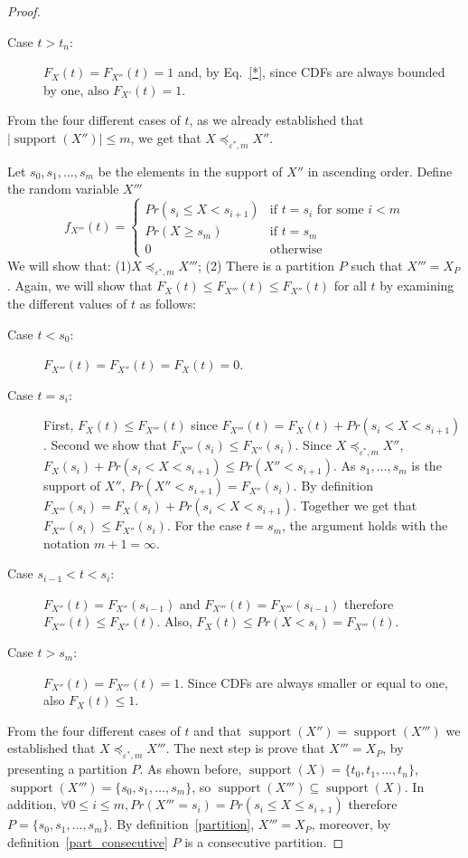 \documentclass[review]{elsarticle}
\DeclareMathOperator{\supp}{support}
\DeclareMathOperator{\support}{support}
\begin{document}
\begin{proof}
\begin{description}
\item[Case $t > t_n$:] $F_{X}(t)= F_{X''}(t)=1$ and, by Eq.~\eqref{*}, since CDFs are always bounded by one, also $F_{X'}(t)=1$.

\end{description}
From the four different cases of $t$, as we already established that $|\supp(X'')|\leq m$, we get that $X \preceq_{\varepsilon^*,m} X''$. 

Let $s_0,s_1,\dots,s_m$ be the elements in the support of $X''$ in ascending order. Define the random variable $X'''$
$$
f_{X'''}(t) = \begin{cases}
Pr(s_{i} \leq X < s_{i+1}) & \text{if } t=s_i \text{ for some } i < m \\ 
Pr(X \geq s_m)           & \text{if } t=s_m  \\ 
0                        & \text{otherwise}
\end{cases}
$$
We will show that: (1)$X \preceq_{\varepsilon^*,m} X'''$; (2) There is a partition $P$ such that $X'''=X_P$. 
Again, we will show that $F_{X}(t) \leq  F_{X'''}(t) \leq F_{X''}(t)$ for all $t$ by examining the different values of $t$ as follows: 
\begin{description}
\item[Case $t < s_0$:] $F_{X'''}(t)=F_{X''}(t)=F_{X}(t)=0$. 
\item[Case $t=s_i$:] First, $F_{X}(t) \leq F_{X'''}(t)$ since $F_{X'''}(t) = F_{X}(t)+Pr(s_{i} < X < s_{i+1})$.
Second we show that  $F_{X'''}(s_i) \leq F_{X''}(s_i)$. Since $X \preceq_{\varepsilon^*,m} X''$, $F_X(s_i) + Pr(s_i < X < s_{i+1}) \leq  Pr(X''<s_{i+1})$. As $s_1,\dots,s_m$ is the support of $X''$, $Pr(X''<s_{i+1}) = F_{X''}(s_i)$. By definition $F_{X'''}(s_i) = F_X(s_i) + Pr(s_i < X < s_{i+1})$. Together we get that $F_{X'''}(s_i) \leq F_{X''}(s_i)$. For the case $t=s_m$, the argument holds with the notation $m+1=\infty$. 

\item[Case $s_{i-1} < t < s_i$:] $F_{X''}(t)= F_{X''}(s_{i-1})$ and $F_{X'''}(t)= F_{X'''}(s_{i-1})$ therefore $F_{X'''}(t) \leq F_{X''}(t)$. Also, $F_X(t) \leq Pr(X<s_i) = F_{X'''}(t)$.
\item[Case $t > s_m$:] $F_{X''}(t)= F_{X'''}(t)=1$. Since CDFs are always smaller or equal to one, also $F_{X}(t)\leq1$. 
\end{description}
From the four different cases of $t$ and that $\supp(X'')=\supp(X''')$ we established that $X \preceq_{\varepsilon^*,m} X'''$. 
The next step is prove that $X'''=X_P$, by presenting a partition $P$. As shown before, $\support(X)=\{t_0,t_1,\dots,t_n\}$,  $\support(X''')=\{s_0,s_1,\dots,s_m\}$, so $\support(X''')\subseteq \support(X)$. In addition, $\forall 0\leq i\leq m, Pr(X'''=s_i) = Pr(s_i \leq X \leq s_{i+1})$ therefore $P = \{s_0,s_1,\dots,s_m\}$.
By definition~\ref{partition}, $X'''=X_P$, moreover, by definition~\ref{part_consecutive} $P$ is a consecutive partition.
\end{proof}
\end{document}
